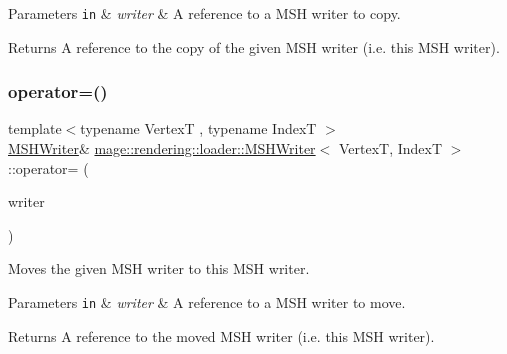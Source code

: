 \begin{DoxyParams}[1]{Parameters}
\mbox{\tt in}  & {\em writer} & A reference to a M\+SH writer to copy. \\
\hline
\end{DoxyParams}
\begin{DoxyReturn}{Returns}
A reference to the copy of the given M\+SH writer (i.\+e. this M\+SH writer). 
\end{DoxyReturn}
\mbox{\label{classmage_1_1rendering_1_1loader_1_1_m_s_h_writer_a98bdde59fa1a7a6398453f0c7bc4e8dd}} 
\subsubsection{\texorpdfstring{operator=()}{operator=()}\hspace{0.1cm}{\footnotesize\ttfamily [2/2]}}
{\footnotesize\ttfamily template$<$typename VertexT , typename IndexT $>$ \\
\mbox{\hyperlink{classmage_1_1rendering_1_1loader_1_1_m_s_h_writer}{M\+S\+H\+Writer}}\& \mbox{\hyperlink{classmage_1_1rendering_1_1loader_1_1_m_s_h_writer}{mage\+::rendering\+::loader\+::\+M\+S\+H\+Writer}}$<$ VertexT, IndexT $>$\+::operator= (\begin{DoxyParamCaption}\item[{\mbox{\hyperlink{classmage_1_1rendering_1_1loader_1_1_m_s_h_writer}{M\+S\+H\+Writer}}$<$ VertexT, IndexT $>$ \&\&}]{writer }\end{DoxyParamCaption})\hspace{0.3cm}{\ttfamily [delete]}}

Moves the given M\+SH writer to this M\+SH writer.


\begin{DoxyParams}[1]{Parameters}
\mbox{\tt in}  & {\em writer} & A reference to a M\+SH writer to move. \\
\hline
\end{DoxyParams}
\begin{DoxyReturn}{Returns}
A reference to the moved M\+SH writer (i.\+e. this M\+SH writer). 
\end{DoxyReturn}
\mbox{\label{classmage_1_1rendering_1_1loader_1_1_m_s_h_writer_ad61ee7097e1bfb52ca9a0697d2cd6a7e}} 
